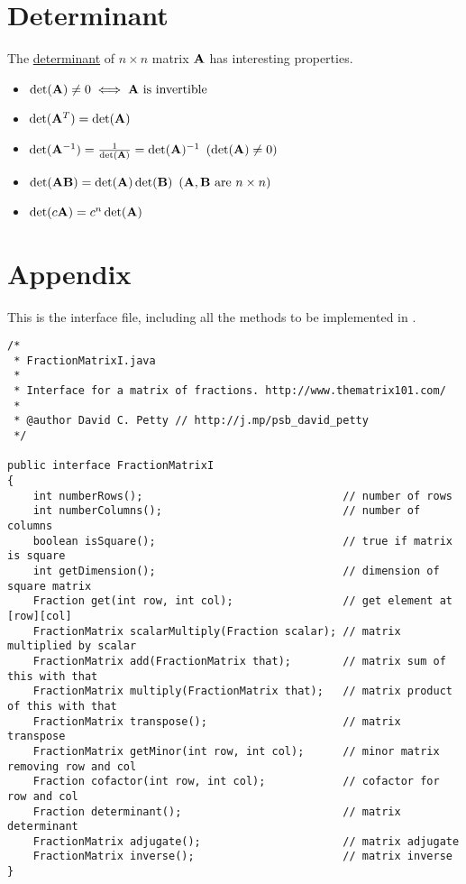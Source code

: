 \documentclass{article}%
\begin{document}
\begin{multicols}{2}
\section{Determinant}
\label{Determinant}

The \href{http://en.wikipedia.org/wiki/Determinant}{determinant} of $n \times n$ matrix $\mathbf{A}$ has interesting properties.
\begin{itemize}
  \item $\det(\mathbf{A})\ne 0 \iff \mathbf{A}\text{ is invertible}$
  \item $\det(\mathbf{A}^T) = \det(\mathbf{A})$
  \item $\det(\mathbf{A}^{-1}) = \frac{1}{\det(\mathbf{A})} = \det(\mathbf{A})^{-1}\ \left( \det(\mathbf{A})\ne0 \right)$
  \item $\det(\mathbf{A}\mathbf{B}) = \det(\mathbf{A}) \det(\mathbf{B})\ \left( \mathbf{A}, \mathbf{B} \text{ are } n \times n \right)$
 \item $\det(c\mathbf{A}) = c^n\det(\mathbf{A})$
\end{itemize}

\section*{Appendix}

This is the  interface file, including all the methods to be implemented in . \\

\begin{lstlisting}[caption=\code{\href{https://pastebin.com/y8sxqtmc}{FractionMatrixI.java}},label=FractionMatrixI]
/*
 * FractionMatrixI.java
 *
 * Interface for a matrix of fractions. http://www.thematrix101.com/
 *
 * @author David C. Petty // http://j.mp/psb_david_petty
 */

public interface FractionMatrixI
{
    int numberRows();                               // number of rows
    int numberColumns();                            // number of columns
    boolean isSquare();                             // true if matrix is square
    int getDimension();                             // dimension of square matrix
    Fraction get(int row, int col);                 // get element at [row][col]
    FractionMatrix scalarMultiply(Fraction scalar); // matrix multiplied by scalar
    FractionMatrix add(FractionMatrix that);        // matrix sum of this with that
    FractionMatrix multiply(FractionMatrix that);   // matrix product of this with that
    FractionMatrix transpose();                     // matrix transpose
    FractionMatrix getMinor(int row, int col);      // minor matrix removing row and col
    Fraction cofactor(int row, int col);            // cofactor for row and col
    Fraction determinant();                         // matrix determinant
    FractionMatrix adjugate();                      // matrix adjugate
    FractionMatrix inverse();                       // matrix inverse
}
\end{lstlisting}


\end{multicols}
\end{document}
